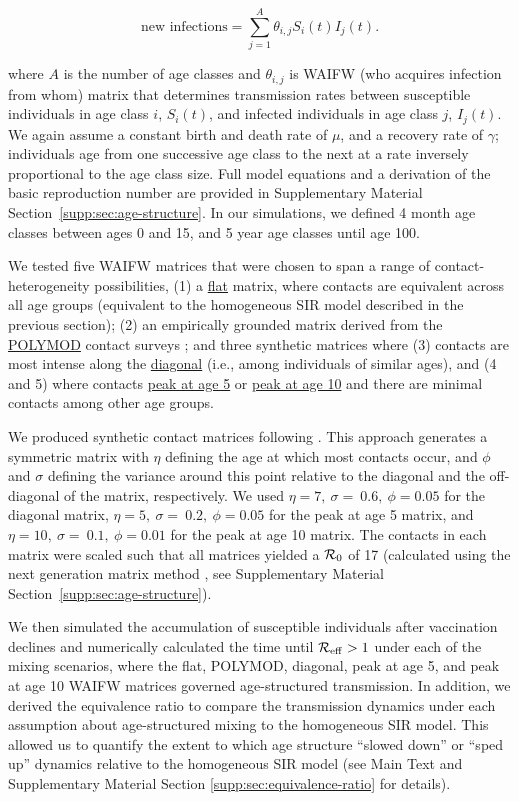 \begin{equation}
\text{new infections} = \sum_{j=1}^{A}\theta_{i,j}S_i(t)I_j(t).
\label{eq:age-structured-incidence-methods}
\end{equation}

\noindent
where $A$ is the number of age classes and $\theta_{i,j}$ is WAIFW (who acquires infection from whom) matrix \citep{GrenfellAnderson1989,AndersonMay1991} that determines transmission rates between susceptible individuals in age class $i$, $S_{i}(t)$, and infected individuals in age class $j$, $I_{j}(t)$. We again assume a constant birth and death rate of $\mu$, and a recovery rate of $\gamma$; individuals age from one successive age class to the next at a rate inversely proportional to the age class size. Full model equations and a derivation of the basic reproduction number are provided in Supplementary Material Section~\ref{supp:sec:age-structure}. In our simulations, we defined 4 month age classes between ages 0 and 15, and 5 year age classes until age 100.

We tested five WAIFW matrices that were chosen to span a range of contact-heterogeneity possibilities, (1) a \ul{flat} matrix, where contacts are equivalent across all age groups (equivalent to the homogeneous SIR model described in the previous section); (2) an empirically grounded matrix derived from the \ul{POLYMOD} contact surveys \citep{MossongEtAl2008}; and three synthetic matrices where (3) contacts are most intense along the \ul{diagonal} (i.e., among individuals of similar ages), and (4 and 5) where contacts \ul{peak at age 5} or \ul{peak at age 10} and there are minimal contacts among other age groups.

We produced synthetic contact matrices following \citep{FarringtonWhitaker2005}. This approach generates a symmetric matrix with $\eta$ defining the age at which most contacts occur, and $\phi$ and $\sigma$ defining the variance around this point relative to the diagonal and the off-diagonal of the matrix, respectively. We used $\eta = 7,\ \sigma = \ 0.6,\ \phi = 0.05$ for the diagonal matrix, $\eta = 5,\ \sigma = \ 0.2,\ \phi = 0.05$ for the peak at age 5 matrix, and $\eta = 10,\ \sigma = \ 0.1,\ \phi = 0.01$ for the peak at age 10 matrix. The contacts in each matrix were scaled such that all matrices yielded a $\mathcal{R}_{0}$ of 17 (calculated using the next generation matrix method \citep{DiekmannEtAl1990}, see Supplementary Material Section~\ref{supp:sec:age-structure}).

We then simulated the accumulation of susceptible individuals after vaccination declines and numerically calculated the time until $\mathcal{R}_{\mathrm{eff}}>1$ under each of the mixing scenarios, where the flat, POLYMOD, diagonal, peak at age 5, and peak at age 10 WAIFW matrices governed age-structured transmission. In addition, we derived the equivalence ratio to compare the transmission dynamics under each assumption about age-structured mixing to the homogeneous SIR model. This allowed us to quantify the extent to which age structure ``slowed down'' or ``sped up'' dynamics relative to the homogeneous SIR model (see Main Text and Supplementary Material Section \ref{supp:sec:equivalence-ratio} for details).

